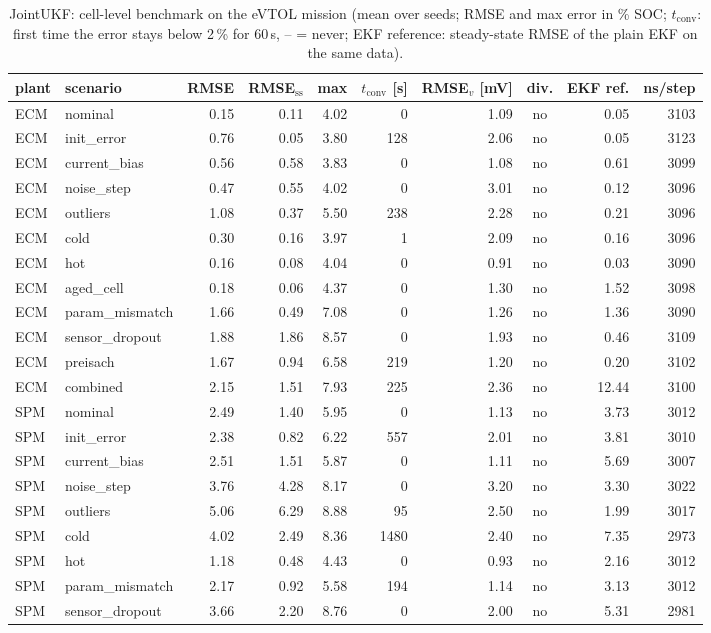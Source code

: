 \begin{table}[H]\centering\footnotesize\setlength{\tabcolsep}{4pt}
\caption{JointUKF: cell-level benchmark on the eVTOL mission (mean over seeds; RMSE and max error in \% SOC; $t_\mathrm{conv}$: first time the error stays below 2\,\% for 60\,s, -- = never; EKF reference: steady-state RMSE of the plain EKF on the same data).}\label{tab:cell_JointUKF}
\begin{tabular}{llrrrrrcrr}\toprule
plant & scenario & RMSE & RMSE$_\mathrm{ss}$ & max & $t_\mathrm{conv}$ [s] & RMSE$_v$ [mV] & div. & EKF ref. & ns/step \\ \midrule
ECM & nominal & 0.15 & 0.11 & 4.02 & 0 & 1.09 & no & 0.05 & 3103 \\
ECM & init\_error & 0.76 & 0.05 & 3.80 & 128 & 2.06 & no & 0.05 & 3123 \\
ECM & current\_bias & 0.56 & 0.58 & 3.83 & 0 & 1.08 & no & 0.61 & 3099 \\
ECM & noise\_step & 0.47 & 0.55 & 4.02 & 0 & 3.01 & no & 0.12 & 3096 \\
ECM & outliers & 1.08 & 0.37 & 5.50 & 238 & 2.28 & no & 0.21 & 3096 \\
ECM & cold & 0.30 & 0.16 & 3.97 & 1 & 2.09 & no & 0.16 & 3096 \\
ECM & hot & 0.16 & 0.08 & 4.04 & 0 & 0.91 & no & 0.03 & 3090 \\
ECM & aged\_cell & 0.18 & 0.06 & 4.37 & 0 & 1.30 & no & 1.52 & 3098 \\
ECM & param\_mismatch & 1.66 & 0.49 & 7.08 & 0 & 1.26 & no & 1.36 & 3090 \\
ECM & sensor\_dropout & 1.88 & 1.86 & 8.57 & 0 & 1.93 & no & 0.46 & 3109 \\
ECM & preisach & 1.67 & 0.94 & 6.58 & 219 & 1.20 & no & 0.20 & 3102 \\
ECM & combined & 2.15 & 1.51 & 7.93 & 225 & 2.36 & no & 12.44 & 3100 \\
\midrule
SPM & nominal & 2.49 & 1.40 & 5.95 & 0 & 1.13 & no & 3.73 & 3012 \\
SPM & init\_error & 2.38 & 0.82 & 6.22 & 557 & 2.01 & no & 3.81 & 3010 \\
SPM & current\_bias & 2.51 & 1.51 & 5.87 & 0 & 1.11 & no & 5.69 & 3007 \\
SPM & noise\_step & 3.76 & 4.28 & 8.17 & 0 & 3.20 & no & 3.30 & 3022 \\
SPM & outliers & 5.06 & 6.29 & 8.88 & 95 & 2.50 & no & 1.99 & 3017 \\
SPM & cold & 4.02 & 2.49 & 8.36 & 1480 & 2.40 & no & 7.35 & 2973 \\
SPM & hot & 1.18 & 0.48 & 4.43 & 0 & 0.93 & no & 2.16 & 3012 \\
SPM & param\_mismatch & 2.17 & 0.92 & 5.58 & 194 & 1.14 & no & 3.13 & 3012 \\
SPM & sensor\_dropout & 3.66 & 2.20 & 8.76 & 0 & 2.00 & no & 5.31 & 2981 \\
\bottomrule\end{tabular}\end{table}

